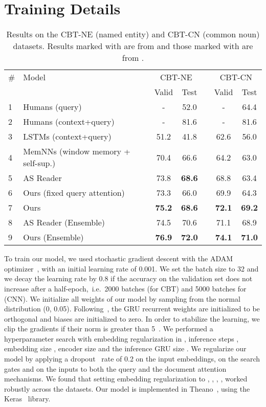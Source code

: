 \documentclass[11pt]{article}
\begin{document}
\section{Training Details}
\begin{table*}[t]
\small
\def\arraystretch{1.1}
\centering
\begin{tabular}{llccccc}
\toprule
\# & Model & \multicolumn{2}{c}{CBT-NE} & \phantom{ab} & \multicolumn{2}{c}{CBT-CN} \\
&& Valid & Test & & Valid & Test \\
\midrule
\small{1}&Humans (query)    &  - & 52.0 &  & - & 64.4 \\
\small 2&Humans (context+query)    & - & 81.6 &  & - & 81.6 \\
\midrule
\small3&LSTMs (context+query)     & 51.2  & 41.8 &  & 62.6 & 56.0 \\
\midrule
\small4&MemNNs (window memory + self-sup.)    & 70.4 & 66.6 &  & 64.2 & 63.0 \\
\small5&AS Reader                             & 73.8 & 
\textbf{68.6} &  & 68.8 & 63.4 \\
\midrule
\small6&Ours (fixed query attention) & 73.3 & 66.0 &  & 69.9 & 64.3 \\
\small7&Ours & \textbf{75.2} & \textbf{68.6} &  & \textbf{72.1} & \textbf{69.2} \\
\midrule
\midrule
\small8&AS Reader (Ensemble)  & 74.5 & 70.6 && 71.1 & 68.9 \\
\small9&Ours (Ensemble) & \textbf{76.9} & \textbf{72.0} && \textbf{74.1} & \textbf{71.0} \\
\bottomrule
\end{tabular}
\caption{\label{tab:cbt}Results on the CBT-NE (named entity) and CBT-CN (common noun) datasets. Results marked with  are from \protect\cite{hill2015goldilocks} and those marked with  are from \protect\cite{watson}.}
\end{table*}

To train our model, we used stochastic gradient descent with the ADAM optimizer~\cite{adam}, with an initial learning rate of 0.001. We set the batch size to 32 and we decay the learning rate by 0.8 if the accuracy on the validation set does not increase after a half-epoch,~i.e.~2000 batches (for CBT) and 5000 batches for (CNN).
We initialize all weights of our model by sampling from the normal distribution (0, 0.05). Following~\cite{saxe2013exact}, the GRU recurrent weights are initialized to be orthogonal and biases are initialized to zero.
In order to stabilize the learning, we clip the gradients if their norm is greater than 5~\cite{Pascanu13}.
We performed a hyperparameter search with embedding regularization in , inference steps , embedding size , encoder size  and the inference GRU size . We regularize our model by applying a dropout~\cite{srivastava2014dropout} rate of 0.2 on the input embeddings, on the search gates and on the inputs to both the query and the document attention mechanisms. We found that setting embedding regularization to , , , ,  worked robustly across the datasets. Our model is implemented in Theano~\cite{Theano12}, using the Keras~\cite{chollet2015keras} library.
\end{document}
